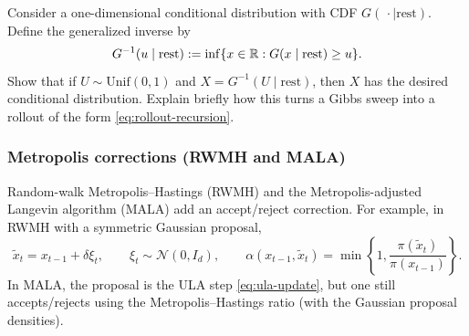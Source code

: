 \documentclass[11pt]{article}
\newif\ifshowsolutions
\newcommand{\SolutionBox}[2][10]{%
  \ifshowsolutions
    \begin{tcolorbox}[stat221panelgray,title={Solution}]
    #2
    \end{tcolorbox}
  \else
    \begin{tcolorbox}[stat221panelgray,unbreakable,title={Workspace}]
    \vspace{#1\baselineskip}
    \end{tcolorbox}
  \fi
}
\begin{document}
\begin{exercise}
\label{ex:reparam-gibbs}
Consider a one-dimensional conditional distribution with CDF $G(\,\cdot \mid \text{rest})$.
Define the generalized inverse by
\[
G^{-1}(u\mid \text{rest}) := \inf\{x\in\R: G(x\mid \text{rest})\ge u\}.
\]
Show that if $U\sim\mathrm{Unif}(0,1)$ and $X=G^{-1}(U\mid \text{rest})$, then $X$ has the desired conditional distribution.
Explain briefly how this turns a Gibbs sweep into a rollout of the form \eqref{eq:rollout-recursion}.
\end{exercise}
\SolutionBox[12]{%
Let $G(\cdot\mid\text{rest})$ be a conditional CDF and define the generalized inverse
\[
G^{-1}(u\mid \text{rest}) := \inf\{x\in\R: G(x\mid \text{rest})\ge u\}.
\]
Set $X:=G^{-1}(U\mid\text{rest})$ with $U\sim\mathrm{Unif}(0,1)$ independent of $\text{rest}$.
For any $x$, the defining property of the generalized inverse gives
\[
\{X\le x\}
\iff \{G^{-1}(U\mid\text{rest})\le x\}
\iff \{U\le G(x\mid\text{rest})\}.
\]
Taking conditional probabilities given $\text{rest}$ yields
\[
\mathbb{P}(X\le x\mid\text{rest})
=\mathbb{P}(U\le G(x\mid\text{rest})\mid\text{rest})
=G(x\mid\text{rest}),
\]
since $U$ is uniform on $(0,1)$.
Therefore $X$ has conditional CDF $G(\cdot\mid\text{rest})$ as desired.

In a Gibbs sampler, each coordinate (or block) update draws from a conditional distribution.
Replacing each draw by an inverse-CDF transform of an independent uniform random variable makes the update a deterministic function of the current state and the new randomness.
Composing the coordinate/block updates within one sweep yields a transition map $F$, so the chain can be written as $x_t=F(x_{t-1},\xi_t)$ and hence as a rollout \eqref{eq:rollout-recursion}.%
}

\subsubsection{Metropolis corrections (RWMH and MALA)}
\label{subsubsec:metropolis}

Random-walk Metropolis--Hastings (RWMH) and the Metropolis-adjusted Langevin algorithm (MALA) add an accept/reject correction.
For example, in RWMH with a symmetric Gaussian proposal,
\[
\tilde x_t = x_{t-1} + \delta \xi_t,
\qquad \xi_t \sim \mathcal{N}(0,I_d),
\qquad
\alpha(x_{t-1},\tilde x_t) = \min\!\left\{1,\frac{\pi(\tilde x_t)}{\pi(x_{t-1})}\right\}.
\]
In MALA, the proposal is the ULA step \eqref{eq:ula-update}, but one still accepts/rejects using the Metropolis--Hastings ratio (with the Gaussian proposal densities).
\end{document}

